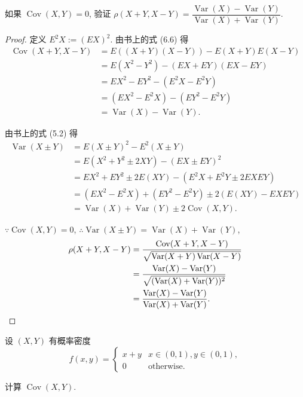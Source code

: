 \documentclass{ctexart}
\begin{document}
\begin{exercise}%
    如果 $\operatorname{Cov}(X,Y)=0$, 验证 $\rho(X+Y,X-Y)=\dfrac{\operatorname{Var}(X)-\operatorname{Var}(Y)}{\operatorname{Var}(X)+\operatorname{Var}(Y)}$.
\end{exercise}
\begin{proof}
    定义 $E^2X:=(EX)^2$. 由书上的式 (6.6) 得
    \begin{align*}
        \operatorname{Cov}(X+Y,X-Y) & =E((X+Y)(X-Y))-E(X+Y)E(X-Y) \\
        & =E(X^2-Y^2)-(EX+EY)(EX-EY) \\
        & =EX^2-EY^2-(E^2X-E^2Y) \\
        & =(EX^2-E^2X)-(EY^2-E^2Y) \\
        & =\operatorname{Var}(X)-\operatorname{Var}(Y).
    \end{align*}

    由书上的式 (5.2) 得
    \begin{align*}
        \operatorname{Var}(X\pm Y) & =E(X\pm Y)^2-E^2(X\pm Y) \\
        & =E(X^2+Y^2\pm2XY)-(EX\pm EY)^2 \\
        & =EX^2+EY^2\pm2E(XY)-(E^2X+E^2Y\pm2EXEY) \\
        & =(EX^2-E^2X)+(EY^2-E^2Y)\pm2(E(XY)-EXEY) \\
        & =\operatorname{Var}(X)+\operatorname{Var}(Y)\pm2\operatorname{Cov}(X,Y).
    \end{align*}

    $\because\operatorname{Cov}(X,Y)=0$, $\therefore\operatorname{Var}(X\pm Y)=\operatorname{Var}(X)+\operatorname{Var}(Y)$,
    \begin{align*}
        \rho(X+Y,X-Y) & =\dfrac{\operatorname{Cov}(X+Y,X-Y)}{\sqrt{\operatorname{Var}(X+Y)\operatorname{Var}(X-Y)}} \\
        & =\dfrac{\operatorname{Var}(X)-\operatorname{Var}(Y)}{\sqrt{(\operatorname{Var}(X)+\operatorname{Var}(Y))^2}} \\
        & =\dfrac{\operatorname{Var}(X)-\operatorname{Var}(Y)}{\operatorname{Var}(X)+\operatorname{Var}(Y)}.\qedhere
    \end{align*}
\end{proof}
\begin{exercise}%
    设 $(X,Y)$ 有概率密度
    \[f(x,y)=\begin{cases}
        x+y & x\in(0,1),y\in(0,1), \\
        0 & \text{otherwise}.
    \end{cases}\]

    计算 $\operatorname{Cov}(X,Y)$.
\end{exercise}
\end{document}
